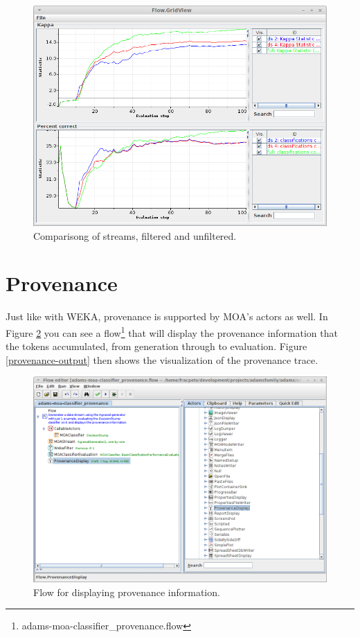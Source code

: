 \documentclass[a4paper]{book}
\begin{document}
\begin{figure}[htb]
  \centering
  \includegraphics[width=12.0cm]{images/moa-stream-filtering_output.png}
  \caption{Comparisong of streams, filtered and unfiltered.}
  \label{moa-stream-filtering_output}
\end{figure}

\clearpage
\newpage
\section{Provenance}
Just like with WEKA, provenance is supported by MOA's actors as well.
In Figure \ref{provenance-flow} you can see a 
flow\footnote{adams-moa-classifier\_provenance.flow} that will display the
provenance information that the tokens accumulated, from generation through 
to evaluation. Figure \ref{provenance-output} then shows the visualization
of the provenance trace.

\begin{figure}[htb]
  \centering
  \includegraphics[width=12.0cm]{images/provenance-flow.png}
  \caption{Flow for displaying provenance information.}
  \label{provenance-flow}
\end{figure}
\end{document}
